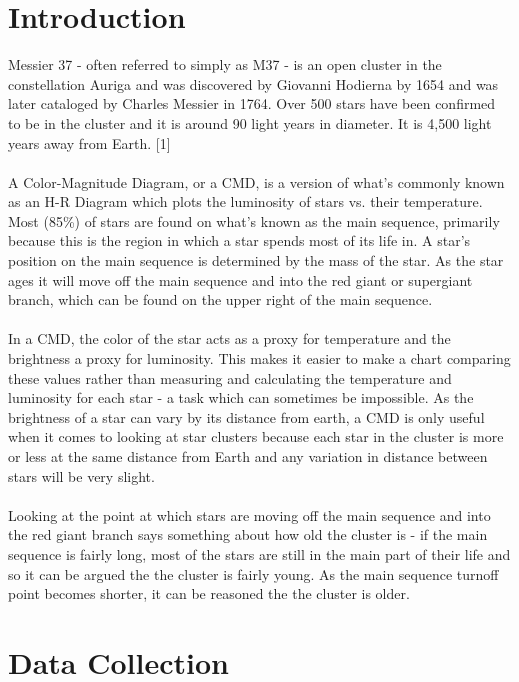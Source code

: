 \documentclass[12pt]{article}
\begin{document}
	\section{Introduction}
		Messier 37 - often referred to simply as M37 - is an open cluster in the constellation Auriga and was discovered by Giovanni Hodierna by 1654 and was later cataloged by Charles Messier in 1764. Over 500 stars have been confirmed to be in the cluster and it is around 90 light years in diameter. It is 4,500 light years away from Earth. [1]
		\\\\
		A Color-Magnitude Diagram, or a CMD, is a version of what's commonly known as an H-R Diagram which plots the luminosity of stars vs. their temperature. Most (85\%) of stars are found on what's known as the main sequence, primarily because this is the region in which a star spends most of its life in. A star's position on the main sequence is determined by the mass of the star. As the star ages it will move off the main sequence and into the red giant or supergiant branch, which can be found on the upper right of the main sequence. 
		\\\\
		In a CMD, the color of the star acts as a proxy for temperature and the brightness a proxy for luminosity. This makes it easier to make a chart comparing these values rather than measuring and calculating the temperature and luminosity for each star - a task which can sometimes be impossible. As the brightness of a star can vary by its distance from earth, a CMD is only useful when it comes to looking at star clusters because each star in the cluster is more or less at the same distance from Earth and any variation in distance between stars will be very slight.
		\\\\
		Looking at the point at which stars are moving off the main sequence and into the red giant branch says something about how old the cluster is - if the main sequence is fairly long, most of the stars are still in the main part of their life and so it can be argued the the cluster is fairly young. As the main sequence turnoff point becomes shorter, it can be reasoned the the cluster is older.
		
		
	\section{Data Collection}
\end{document}
